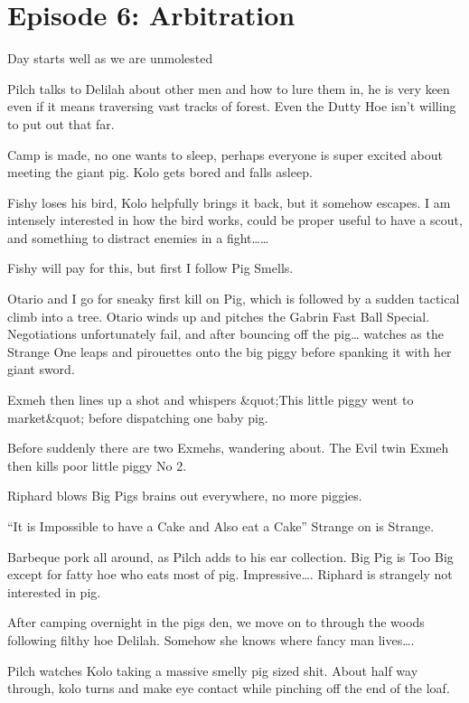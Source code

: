 \section{Episode 6: Arbitration}

Day starts well as we are unmolested    

Pilch talks to Delilah about other men and how to lure them in, he is very keen even if it means traversing vast tracks of forest. Even the Dutty Hoe isn’t willing to put out that far.    

Camp is made, no one wants to sleep, perhaps everyone is super excited about meeting the giant pig. Kolo gets bored and falls asleep.    

Fishy loses his bird, Kolo helpfully brings it back, but it somehow escapes. I am intensely interested in how the bird works, could be proper useful to have a scout, and something to distract enemies in a fight……    

Fishy will pay for this, but first I follow Pig Smells.    

Otario and I go for sneaky first kill on Pig, which is followed by a sudden tactical climb into a tree. Otario winds up and pitches the Gabrin Fast Ball Special. Negotiations unfortunately fail, and after bouncing off the pig… watches as the Strange One leaps and pirouettes onto the big piggy before spanking it with her giant sword.    

Exmeh then lines up a shot and whispers &quot;This little piggy went to market&quot; before dispatching one baby pig.    

Before suddenly there are two Exmehs, wandering about. The Evil twin Exmeh then kills poor little piggy No 2.    

Riphard blows Big Pigs brains out everywhere, no more piggies.    

“It is Impossible to have a Cake and Also eat a Cake” Strange on is Strange.    

Barbeque pork all around, as Pilch adds to his ear collection. Big Pig is Too Big except for fatty hoe who eats most of pig. Impressive…. Riphard is strangely not interested in pig.    

After camping overnight in the pigs den, we move on to through the woods following filthy hoe Delilah. Somehow she knows where fancy man lives….    

Pilch watches Kolo taking a massive smelly pig sized shit. About half way through, kolo turns and make eye contact while pinching off the end of the loaf.    

